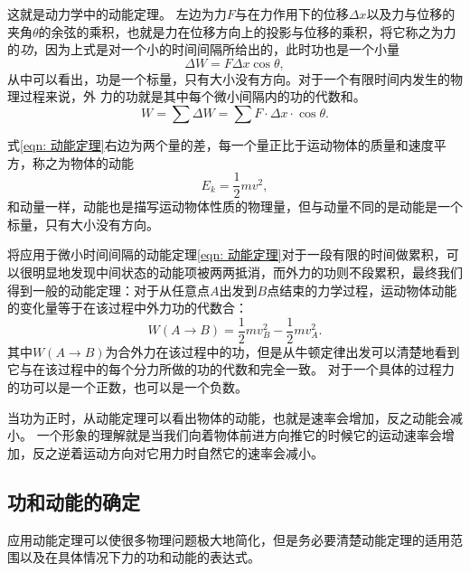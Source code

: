 这就是动力学中的动能定理。
左边为力$F$与在力作用下的位移$\Delta x$以及力与位移的夹角$\theta$的余弦的乘积，也就是力在位移方向上的投影与位移的乘积，将它称之为力的\emph{功}，因为上式是对一个小的时间间隔所给出的，此时功也是一个小量
\begin{equation}\label{eqn: 动能定理-功的微分}
\Delta W = F \Delta x \cos\theta,
\end{equation}
从中可以看出，功是一个标量，只有大小没有方向。对于一个有限时间内发生的物理过程来说，外
力的功就是其中每个微小间隔内的功的代数和。
\begin{equation}
W = \sum \Delta W = \sum F\cdot \Delta x\cdot\cos\theta.
\end{equation}

式\ref{eqn: 动能定理}右边为两个量的差，每一个量正比于运动物体的质量和速度平方，称之为物体的动能
\begin{equation}
E_k = \frac{1}{2}mv^2,
\end{equation}
和动量一样，动能也是描写运动物体性质的物理量，但与动量不同的是动能是一个标量，只有大小没有方向。

将应用于微小时间间隔的动能定理\ref{eqn: 动能定理}对于一段有限的时间做累积，可以很明显地发现中间状态的动能项被两两抵消，而外力的功则不段累积，最终我们得到一般的动能定理：对于从任意点$A$出发到$B$点结束的力学过程，运动物体动能的变化量等于在该过程中外力功的代数合：
\begin{equation}
W(A\rightarrow B) =  \frac{1}{2}mv_B^2-\frac{1}{2}mv_A^2.
\end{equation}
其中$W(A\rightarrow B) $为合外力在该过程中的功，但是从牛顿定律出发可以清楚地看到它与在该过程中的每个分力所做的功的代数和完全一致。
对于一个具体的过程力的功可以是一个正数，也可以是一个负数。

当功为正时，从动能定理可以看出物体的动能，也就是速率会增加，反之动能会减小。
一个形象的理解就是当我们向着物体前进方向推它的时候它的运动速率会增加，反之逆着运动方向对它用力时自然它的速率会减小。

\subsection{功和动能的确定}

应用动能定理可以使很多物理问题极大地简化，但是务必要清楚动能定理的适用范围以及在具体情况下力的功和动能的表达式。

